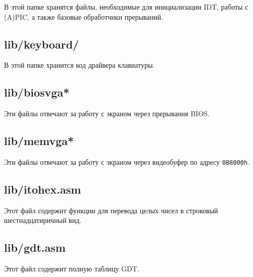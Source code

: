В этой папке хранятся файлы, необходимые для инициализации IDT, работы с (A)PIC, а также базовые обработчики прерываний.

\subsection{lib/keyboard/}

В этой папке хранится код драйвера клавиатуры.

\subsection{lib/biosvga*}

Эти файлы отвечают за работу с экраном через прерывания BIOS.

\subsection{lib/memvga*}

Эти файлы отвечают за работу с экраном через видеобуфер по адресу \verb|0B8000h|.

\subsection{lib/itohex.asm}

Этот файл содержит функции для перевода целых чисел в строковый шестнадцатиричный вид.

\subsection{lib/gdt.asm}

Этот файл содержит полную таблицу GDT.